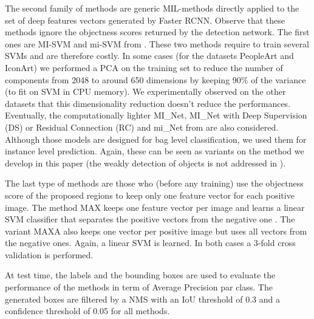 \documentclass[preprint]{elsarticle}
\newcommand\MAX{MAX}
\newcommand\MAXA{MAXA}
\begin{document}
The second family of methods are generic MIL-methods directly applied to the set of deep features vectors generated by Faster RCNN. Observe that these methods ignore the objectness scores returned by the detection network. The first ones are MI-SVM and mi-SVM from \cite{andrews_support_2003}. These two methods require to train several SVMs and are therefore costly. In some cases (for the datasets PeopleArt and IconArt) we performed a PCA on the training set to reduce the number of components from 2048 to around 650 dimensions by keeping 90\% of the variance (to fit on SVM in CPU memory). We experimentally observed on the other datasets that this dimensionality reduction doesn't reduce the performances. Eventually, the computationally lighter MI\_Net, MI\_Net with Deep Supervision (DS) or Residual Connection (RC) and mi\_Net from \cite{wang_revisiting_2018} are also considered. Although those models are designed for bag level classification, we used them for instance level prediction. Again, these can be seen as variants on the method we develop in this paper (the weakly detection of objects is not addressed in \cite{wang_revisiting_2018}). 

The last type of methods are those who (before any training) use the objectness score of the proposed regions to keep only one feature vector for each positive image. The method \MAX{} keeps one feature vector per image and learns a linear SVM classifier that separates the positive vectors from the negative one \cite{crowley_art_2016}. The variant \MAXA{} also keeps one vector per positive image but uses all vectors from the negative ones. Again, a linear SVM is learned. In both cases a 3-fold cross validation is performed. 





At test time, the labels and the bounding boxes are used to evaluate the performance of the methods in term of Average Precision par class. The generated boxes are filtered by a NMS with an IoU threshold of 0.3 \cite{everingham_pascal_2007} and a confidence threshold of 0.05 for all methods.
\end{document}
